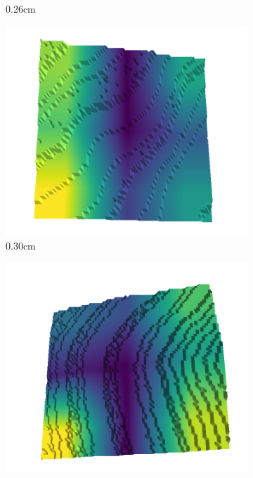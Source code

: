 \begin{figure}[H]
\begin{subfigure}[b]{0.192\linewidth}
    \caption{0.26cm}
    \label{fig : quarry-best-2}
    \end{subfigure}
    \begin{subfigure}[b]{0.192\linewidth}
    \includegraphics[width=\linewidth]{../img/5/quarry/best/30-patch-3d-majavi-colormap-20.png}
    \caption{0.30cm}
    \label{fig : quarry-best-3}
    \end{subfigure}
    \begin{subfigure}[b]{0.192\linewidth}
    \includegraphics[width=\linewidth]{../img/5/quarry/best/34-patch-3d-majavi-colormap-30.png}

\end{subfigure}
\end{figure}
